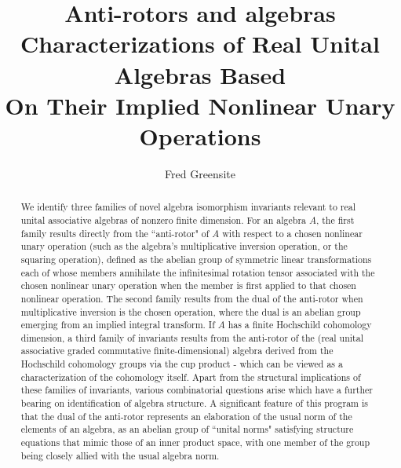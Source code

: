 \documentclass{amsart}
\numberwithin{equation}{section}
\theoremstyle{definition}
\numberwithin{theorem}{section}
\begin{document}
       
             \title{Anti-rotors and algebras \\     C\MakeLowercase{haracterizations of} R\MakeLowercase{eal} U\MakeLowercase{nital} A\MakeLowercase{lgebras} B\MakeLowercase{ased} \\O\MakeLowercase{n}  T\MakeLowercase{heir} I\MakeLowercase{mplied} N\MakeLowercase{onlinear} U\MakeLowercase{nary} O\MakeLowercase{perations}
}
             
    \author{Fred Greensite}
    
   \begin{abstract}  We identify three families of novel algebra isomorphism invariants relevant to real unital associative algebras of nonzero finite dimension.  For an algebra $A$, the first family results directly from the ``anti-rotor" of $A$ with respect to a chosen nonlinear unary operation (such as the algebra's multiplicative inversion operation, or the squaring operation), defined as the abelian group of symmetric linear transformations each of whose members  annihilate the infinitesimal rotation tensor associated with the chosen nonlinear unary operation when the member is first applied to that chosen nonlinear operation.  The second family results from the dual of the anti-rotor when multiplicative inversion is the chosen operation, where the dual is an abelian group emerging from an implied integral transform.  If $A$ has a finite Hochschild cohomology dimension, a third family of invariants results from the anti-rotor of the (real unital associative graded commutative finite-dimensional) algebra derived from the Hochschild cohomology groups via the cup product - which can be viewed as a characterization of the cohomology itself.  Apart from the structural implications of these families of invariants, various combinatorial questions arise which have a further bearing on identification of algebra structure.  A significant feature of this program is that the dual of the anti-rotor represents an elaboration of the usual norm of the elements of an algebra, as an abelian group of ``unital norms" satisfying structure equations that mimic those of an inner product space, with one member of the group being closely allied with the usual algebra norm. \end{abstract}
        
  \maketitle

  
\end{document}
